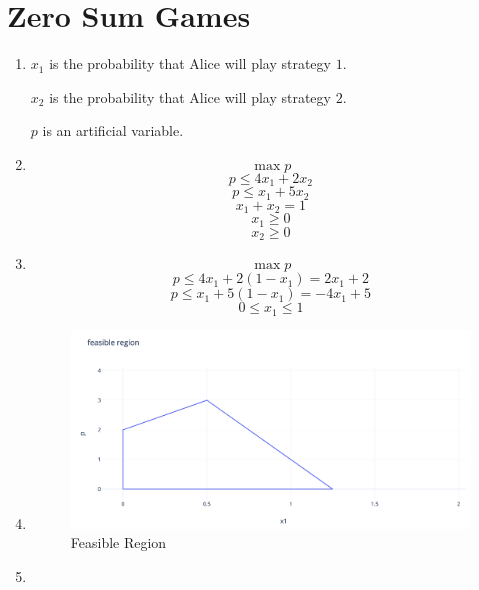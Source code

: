 \documentclass[11pt]{article}
\newenvironment{qparts}{\begin{enumerate}[{(}a{)}]}{\end{enumerate}}
\begin{document}
\section{Zero Sum Games}
\begin{qparts}
	\item 
	
	$x_1$ is the probability that Alice will play strategy $1$. 
	
	$x_2$ is the probability that Alice will play strategy $2$.
	
	$p$ is an artificial variable.
	
	\item
	
	\[
		\max p
	\]
	\[
		p \le 4x_1 +2x_2
	\]
	\[
		p \le x_1 +5x_2
	\]
	\[
		x_1 + x_2 = 1
	\]
	\[
		x_1 \ge 0
	\]
	\[
		x_2 \ge 0
	\]

	\item
	
	\[
		\max p
	\]
	\[
		p \le 4x_1 +2(1 - x_1) = 2x_1 + 2
	\]
	\[
		p \le x_1 +5(1 - x_1) = -4x_1 + 5
	\]
	\[
		0 \le x_1 \le 1
	\]
	
	\item \text{ }
	
	\begin{figure}[h]
	\centering
	\includegraphics[width=.8\textwidth]{feasible_region.png}
	\caption{\label{fig:feasible_region}Feasible Region}
	\end{figure}
	
	\item
	
\end{qparts}




\newpage
\end{document}
